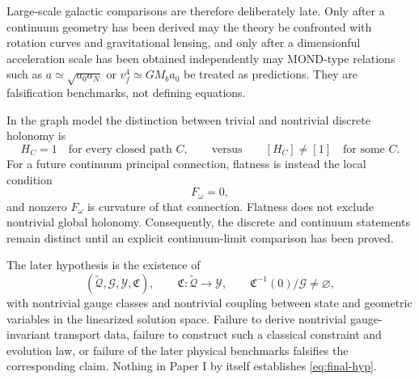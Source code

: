 \documentclass[11pt,a4paper]{article}
\theoremstyle{remark}
\newcommand{\tQ}{\widetilde{\mathcal Q}}
\newcommand{\cG}{\mathcal G}
\newcommand{\cY}{\mathcal Y}
\begin{document}
Large-scale galactic comparisons are therefore deliberately late.  Only after a continuum geometry has been derived may the theory be confronted with rotation curves and gravitational lensing, and only after a dimensionful acceleration scale has been obtained independently may MOND-type relations such as \(a\simeq\sqrt{a_0a_N}\) or \(v_f^4\simeq GM_ba_0\) be treated as predictions.  They are falsification benchmarks, not defining equations.

In the graph model the distinction between trivial and nontrivial discrete holonomy is
\begin{equation}
  H_C=1
  \quad\text{for every closed path }C,
  \qquad\text{versus}\qquad
  [H_C]\neq[1]
  \quad\text{for some }C.
\tag{10.6}
\end{equation}
For a future continuum principal connection, flatness is instead the local condition
\begin{equation}
  F_\omega=0,
\tag{10.7}
\end{equation}
and nonzero \(F_\omega\) is curvature of that connection.  Flatness does not exclude nontrivial global holonomy.  Consequently, the discrete and continuum statements remain distinct until an explicit continuum-limit comparison has been proved.

The later hypothesis is the existence of
\begin{equation}
  (\tQ,\cG,\cY,\mathfrak C),
  \qquad
  \mathfrak C:\tQ\to\cY,
  \qquad
  \mathfrak C^{-1}(0)/\cG\neq\varnothing,
\tag{10.8}\label{eq:final-hyp}
\end{equation}
with nontrivial gauge classes and nontrivial coupling between state and geometric variables in the linearized solution space.  Failure to derive nontrivial gauge-invariant transport data, failure to construct such a classical constraint and evolution law, or failure of the later physical benchmarks falsifies the corresponding claim.  Nothing in Paper I by itself establishes \eqref{eq:final-hyp}.
\end{document}
